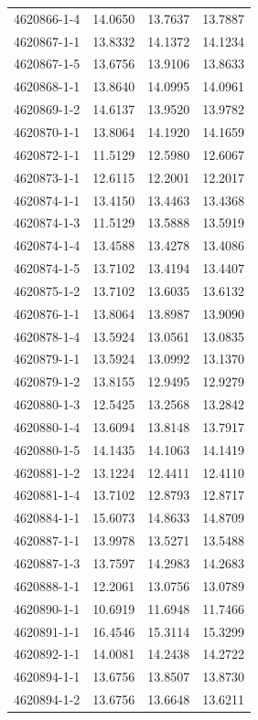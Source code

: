 \begin{longtable}{lrrr}
4620866-1-4 & 14.0650 & 13.7637 & 13.7887 \\
4620867-1-1 & 13.8332 & 14.1372 & 14.1234 \\
4620867-1-5 & 13.6756 & 13.9106 & 13.8633 \\
4620868-1-1 & 13.8640 & 14.0995 & 14.0961 \\
4620869-1-2 & 14.6137 & 13.9520 & 13.9782 \\
4620870-1-1 & 13.8064 & 14.1920 & 14.1659 \\
4620872-1-1 & 11.5129 & 12.5980 & 12.6067 \\
4620873-1-1 & 12.6115 & 12.2001 & 12.2017 \\
4620874-1-1 & 13.4150 & 13.4463 & 13.4368 \\
4620874-1-3 & 11.5129 & 13.5888 & 13.5919 \\
4620874-1-4 & 13.4588 & 13.4278 & 13.4086 \\
4620874-1-5 & 13.7102 & 13.4194 & 13.4407 \\
4620875-1-2 & 13.7102 & 13.6035 & 13.6132 \\
4620876-1-1 & 13.8064 & 13.8987 & 13.9090 \\
4620878-1-4 & 13.5924 & 13.0561 & 13.0835 \\
4620879-1-1 & 13.5924 & 13.0992 & 13.1370 \\
4620879-1-2 & 13.8155 & 12.9495 & 12.9279 \\
4620880-1-3 & 12.5425 & 13.2568 & 13.2842 \\
4620880-1-4 & 13.6094 & 13.8148 & 13.7917 \\
4620880-1-5 & 14.1435 & 14.1063 & 14.1419 \\
4620881-1-2 & 13.1224 & 12.4411 & 12.4110 \\
4620881-1-4 & 13.7102 & 12.8793 & 12.8717 \\
4620884-1-1 & 15.6073 & 14.8633 & 14.8709 \\
4620887-1-1 & 13.9978 & 13.5271 & 13.5488 \\
4620887-1-3 & 13.7597 & 14.2983 & 14.2683 \\
4620888-1-1 & 12.2061 & 13.0756 & 13.0789 \\
4620890-1-1 & 10.6919 & 11.6948 & 11.7466 \\
4620891-1-1 & 16.4546 & 15.3114 & 15.3299 \\
4620892-1-1 & 14.0081 & 14.2438 & 14.2722 \\
4620894-1-1 & 13.6756 & 13.8507 & 13.8730 \\
4620894-1-2 & 13.6756 & 13.6648 & 13.6211 \\

\end{longtable}
